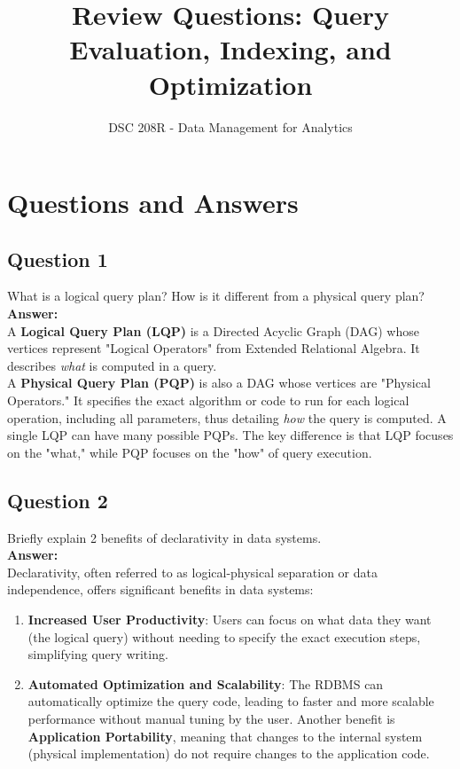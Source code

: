 \documentclass{article}
\title{Review Questions: Query Evaluation, Indexing, and Optimization}
\author{DSC 208R - Data Management for Analytics}
\date{}
\begin{document}
\maketitle

\section*{Questions and Answers}

\subsection*{Question 1}
What is a logical query plan? How is it different from a physical query plan?\\

\textbf{Answer:}\\

A \textbf{Logical Query Plan (LQP)} is a Directed Acyclic Graph (DAG) whose vertices represent "Logical Operators" from Extended Relational Algebra. It describes \textit{what} is computed in a query.\\

A \textbf{Physical Query Plan (PQP)} is also a DAG whose vertices are "Physical Operators." It specifies the exact algorithm or code to run for each logical operation, including all parameters, thus detailing \textit{how} the query is computed. A single LQP can have many possible PQPs. The key difference is that LQP focuses on the "what," while PQP focuses on the "how" of query execution.\\

\subsection*{Question 2}
Briefly explain 2 benefits of declarativity in data systems.\\

\textbf{Answer:}\\

Declarativity, often referred to as logical-physical separation or data independence, offers significant benefits in data systems:\\

\begin{enumerate}
    \item \textbf{Increased User Productivity}: Users can focus on what data they want (the logical query) without needing to specify the exact execution steps, simplifying query writing.
    \item \textbf{Automated Optimization and Scalability}: The RDBMS can automatically optimize the query code, leading to faster and more scalable performance without manual tuning by the user. Another benefit is \textbf{Application Portability}, meaning that changes to the internal system (physical implementation) do not require changes to the application code.
\end{enumerate}
\end{document}
